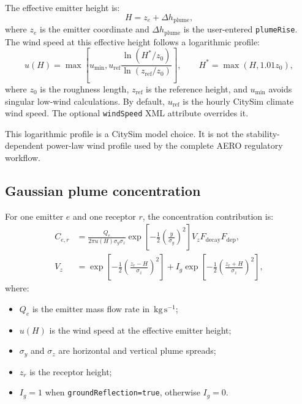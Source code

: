 \documentclass[11pt,a4paper]{article}
\newcommand{\code}[1]{\texttt{#1}}
\newcommand{\unit}[1]{\,\mathrm{#1}}
\begin{document}
The effective emitter height is:
\begin{equation}
  H = z_e + \Delta h_{\mathrm{plume}},
\end{equation}
where $z_e$ is the emitter coordinate and $\Delta h_{\mathrm{plume}}$ is the
user-entered \code{plumeRise}. The wind speed at this effective height follows
a logarithmic profile:
\begin{equation}
  u(H) =
  \max\left[
    u_{\min},
    u_{\mathrm{ref}}
    \frac{\ln(H^\ast/z_0)}{\ln(z_{\mathrm{ref}}/z_0)}
  \right],
  \qquad
  H^\ast=\max(H,1.01z_0),
  \label{eq:pollutant-wind-profile}
\end{equation}
where $z_0$ is the roughness length, $z_{\mathrm{ref}}$ is the reference
height, and $u_{\min}$ avoids singular low-wind calculations. By default,
$u_{\mathrm{ref}}$ is the hourly CitySim climate wind speed. The optional
\code{windSpeed} XML attribute overrides it.

This logarithmic profile is a CitySim model choice. It is not the
stability-dependent power-law wind profile used by the complete AERO regulatory
workflow.

\subsection{Gaussian plume concentration}

For one emitter $e$ and one receptor $r$, the concentration contribution is:
\begin{align}
 C_{e,r} &=
 \frac{Q_e}{2\pi u(H)\sigma_y\sigma_z}
 \exp\left[-\frac{1}{2}\left(\frac{y}{\sigma_y}\right)^2\right]
 V_z F_{\mathrm{decay}}F_{\mathrm{dep}}, \\
 V_z &=
 \exp\left[-\frac{1}{2}\left(\frac{z_r-H}{\sigma_z}\right)^2\right]
 + I_g
 \exp\left[-\frac{1}{2}\left(\frac{z_r+H}{\sigma_z}\right)^2\right],
 \label{eq:gaussian-plume}
\end{align}
where:
\begin{itemize}
  \item $Q_e$ is the emitter mass flow rate in $\unit{kg\,s^{-1}}$;
  \item $u(H)$ is the wind speed at the effective emitter height;
  \item $\sigma_y$ and $\sigma_z$ are horizontal and vertical plume spreads;
  \item $z_r$ is the receptor height;
  \item $I_g=1$ when \code{groundReflection=true}, otherwise $I_g=0$.
\end{itemize}
\end{document}

